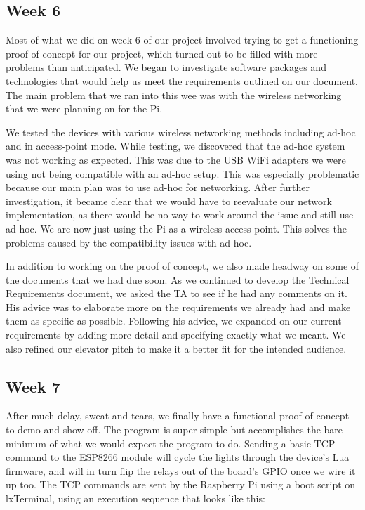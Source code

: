 \documentclass[letterpaper,10pt]{article}
\begin{document}
\subsection{Week 6}
 
Most of what we did on week 6 of our project involved trying to get a
functioning proof of concept for our project, which turned out to be filled
with more problems than anticipated. We began to investigate software packages
and technologies that would help us meet the requirements outlined on our
document. The main problem that we ran into this wee was with the wireless
networking that we were planning on for the Pi.

We tested the devices with various wireless networking methods including ad-hoc
and in access-point mode. While testing, we discovered that the ad-hoc system
was not working as expected. This was due to the USB WiFi adapters we were
using not being compatible with an ad-hoc setup. This was especially
problematic because our main plan was to use ad-hoc for networking. After
further investigation, it became clear that we would have to reevaluate our
network implementation, as there would be no way to work around the issue and
still use ad-hoc. We are now just using the Pi as a wireless access point. This
solves the problems caused by the compatibility issues with ad-hoc.

In addition to working on the proof of concept, we also made headway on some of
the documents that we had due soon. As we continued to develop the Technical
Requirements document, we asked the TA to see if he had any comments on it. His
advice was to elaborate more on the requirements we already had and make them
as specific as possible. Following his advice, we expanded on our current
requirements by adding more detail and specifying exactly what we meant. We
also refined our elevator pitch to make it a better fit for the intended
audience.

\subsection{Week 7}  

After much delay, sweat and tears, we finally have a functional proof 
of concept to demo and show off. The program is super simple but 
accomplishes the bare minimum of what we would expect the program to do.
Sending a basic TCP command to the ESP8266 module will cycle the lights 
through the device's Lua firmware, and will in turn flip the relays out of
the board's GPIO once we wire it up too. The TCP commands are sent by the 
Raspberry Pi using a boot script on lxTerminal, using an execution sequence
that looks like this:
\end{document}
